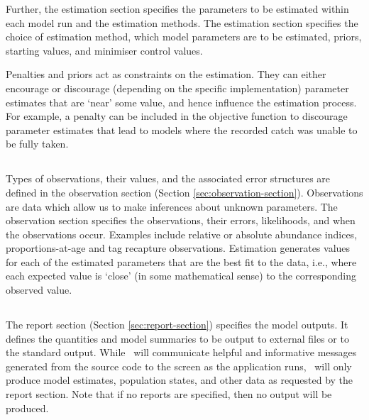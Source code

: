 Further, the estimation section specifies the parameters to be estimated within each model run and the estimation methods. The estimation section specifies the choice of estimation method, which model parameters are to be estimated, priors, starting values, and minimiser control values.

Penalties and priors act as constraints on the estimation. They can either encourage or discourage (depending on the specific implementation) parameter estimates that are `near' some value, and hence influence the estimation process. For example, a penalty can be included in the objective function to discourage parameter estimates that lead to models where the recorded catch was unable to be fully taken.

\subsection{}

Types of observations, their values, and the associated error structures are defined in the observation section (Section \ref{sec:observation-section}). Observations are data which allow us to make inferences about unknown parameters. The observation section specifies the observations, their errors, likelihoods, and when the observations occur. Examples include relative or absolute abundance indices, proportions-at-age and tag recapture observations. Estimation generates values for each of the estimated parameters that are the best fit to the data, i.e., where each expected value is `close' (in some mathematical sense) to the corresponding observed value. 

\subsection{}

The report section (Section \ref{sec:report-section}) specifies the model outputs. It defines the quantities and model summaries to be output to external files or to the standard output. While \CNAME\ will communicate  helpful and informative messages generated from the source code to the screen as the application runs, \CNAME\ will only produce model estimates, population states, and other data as requested by the report section. Note that if no reports are specified, then no output will be produced.

